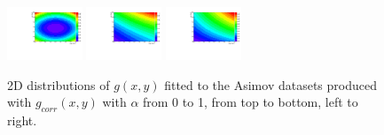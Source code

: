 \begin{figure}[thb]
\includegraphics[width=0.2\textwidth]{figures/sec-background/correlation/res_th2F_obs_th2f_res_alpha_08_n005.pdf}
\includegraphics[width=0.2\textwidth]{figures/sec-background/correlation/res_th2F_obs_th2f_res_alpha_09_n005.pdf}
\includegraphics[width=0.2\textwidth]{figures/sec-background/correlation/res_th2F_obs_th2f_res_alpha_10_n005.pdf}
  \caption{2D distributions of $g(x,y)$ fitted to the Asimov datasets produced with  $g_{corr}(x,y)$ with $\alpha$ from 0 to 1, from top to bottom, left to right.}
  \label{fig:g_alpha}
\end{figure}


